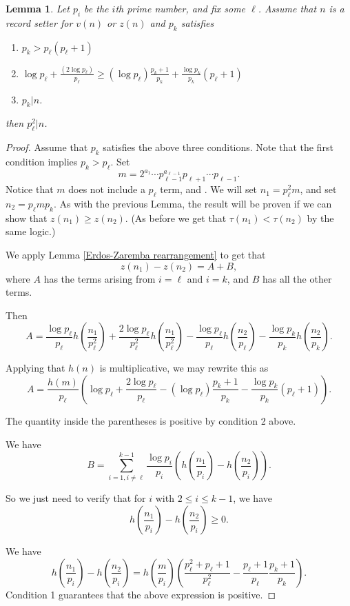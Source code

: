 \documentclass{article}
\newtheorem{lemma}[theorem]{Lemma}
\begin{document}
\begin{lemma} Let $p_i$ be the $i$th prime number, and fix some $\ell$. Assume that $n$ is a record setter for $v(n)$ or $z(n)$  and $p_k$ satisfies \label{repeated prime factor lemma}

\begin{enumerate} 
\item $p_k > p_{\ell}(p_\ell +1)$
\item $\log p_\ell + \frac{(2\log p_\ell) }{p_\ell} \geq  (\log p_\ell)\frac{p_k+1}{p_k} + \frac{\log p_k}{p_k}(p_\ell +1)  $ %
\item $p_k|n$.
\end{enumerate}
then  $p_\ell^2|n$. 

\end{lemma}
\begin{proof} Assume that $p_k$ satisfies the above three conditions. Note that the first condition implies $p_k > p_\ell$. Set \begin{equation}m= 2^{a_1} \cdots p_{\ell-1}^{a_{\ell-1}}p_{\ell+1}\cdots p_{\ell-1}. \end{equation}
Notice that $m$ does not include a $p_\ell$ term, and  . We will set 
$n_1 = p_\ell^2m$, and set $n_2 = p_\ell mp_k$. As with the previous Lemma, the result will be proven if we can show that $z(n_1) \geq z(n_2)$. (As before we get that $\tau(n_1) < \tau(n_2)$ by the same logic.)

We apply Lemma \ref{Erdos-Zaremba rearrangement} to get that 
$$z(n_1)-z(n_2) = A+B,$$ where $A$ has the terms arising from $i=\ell$ and $i=k$, and $B$ has all the other terms.

Then $$A=\frac{\log p_\ell}{p_\ell}h\left(\frac{n_1}{p_\ell^2} \right) + \frac{2\log p_\ell}{p_\ell^2}h\left(\frac{n_1}{p_\ell^2}\right) - \frac{\log p_\ell}{p_\ell} h\left(\frac{n_2}{p_\ell}\right) -\frac{\log p_k}{p_k}h\left(\frac{n_2}{p_k}\right) .$$

Applying that $h(n)$ is multiplicative, we may rewrite this as 
$$A=\frac{h(m)}{p_\ell}\left(\log p_\ell + \frac{2\log p_\ell }{p_\ell} - (\log p_\ell)\frac{p_k+1}{p_k} - \frac{\log p_k}{p_k}(p_\ell +1) \right). $$


The quantity inside the parentheses is positive by condition 2 above.

We have $$B=\sum_{i=1, i \neq \ell }^{k-1} \frac{\log p_i}{p_i}\left(h\left(\frac{n_1}{p_i}\right) -h\left(\frac{n_2}{p_i}\right)\right). $$

So we just need to verify that for $i$ with $2 \leq i \leq k-1$, we have $$h\left(\frac{n_1}{p_i}\right) - h\left(\frac{n_2}{p_i}\right) \geq 0. $$

We have $$h\left(\frac{n_1}{p_i}\right) - h\left(\frac{n_2}{p_i}\right) = h\left(\frac{m}{p_i}\right)\left(\frac{p_{\ell}^2+ p_\ell + 1}{p_\ell^2} -  \frac{p_\ell +1}{p_\ell}\frac{p_k+1}{p_k}\right). $$
Condition 1 guarantees that the above expression is positive.
 
\end{proof}
\end{document}
